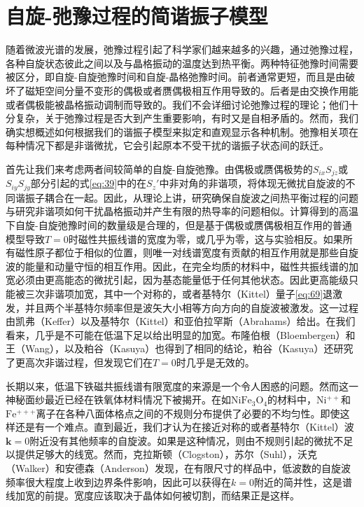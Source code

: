 \documentclass{article}
\begin{document}

\section{自旋-弛豫过程的简谐振子模型} \label{sec:10}

随着微波光谱的发展，弛豫过程引起了科学家们越来越多的兴趣，通过弛豫过程，各种自旋状态彼此之间以及与晶格振动的温度达到热平衡。两种特征弛豫时间需要被区分，即自旋-自旋弛豫时间和自旋-晶格弛豫时间。前者通常更短，而且是由破坏了磁矩空间分量不变形的偶极或者赝偶极相互作用导致的。后者是由交换作用能或者偶极能被晶格振动调制而导致的。我们不会详细讨论弛豫过程的理论；他们十分复杂，关于弛豫过程是否大到产生重要影响，有时又是自相矛盾的。然而，我们确实想概述如何根据我们的谐振子模型来拟定和直观显示各种机制。弛豫相关项在每种情况下都是非谐微扰，它会引起原本不受干扰的谐振子状态间的跃迁。

首先让我们来考虑两者间较简单的自旋-自旋弛豫。由偶极或赝偶极势的$S_{ix}S_{jz}$或$S_{iy}S_{jy}$部分引起的式\eqref{eq:39}中的在$S_z'$中非对角的非谐项，将体现无微扰自旋波的不同谐振子耦合在一起。因此，从理论上讲，研究确保自旋波之间热平衡过程的问题与研究非谐项如何干扰晶格振动并产生有限的热导率的问题相似。计算得到的高温下自旋-自旋弛豫时间的数量级是合理的，但是基于偶极或赝偶极相互作用的普通模型导致$T=0$时磁性共振线谱的宽度为零，或几乎为零，这与实验相反。如果所有磁性原子都位于相似的位置，则唯一对线谱宽度有贡献的相互作用就是那些自旋波的能量和动量守恒的相互作用。因此，在完全均质的材料中，磁性共振线谱的加宽必须由更高能态的微扰引起，因为基态能量低于任何其他状态。因此更高能级只能被三次非谐项加宽，其中一个对称的，或者基特尔（Kittel）量子\eqref{eq:69}退激发，并且两个半基特尔频率但是波矢大小相等方向方向的自旋波被激发。这一过程由凯弗（Keffer）以及基特尔（Kittel）和亚伯拉罕斯（Abrahams）给出。在我们看来，几乎是不可能在低温下足以给出明显的加宽。布隆伯根（Bloembergen）和王（Wang），以及粕谷（Kasuya）也得到了相同的结论，粕谷（Kasuya）还研究了更高次非谐过程，但发现它们在$T=0$时几乎是无效的。

长期以来，低温下铁磁共振线谱有限宽度的来源是一个令人困惑的问题。然而这一神秘面纱最近已经在铁氧体材料情况下被揭开。在如$\mathrm{NiFe_3O_4}$的材料中，$\mathrm{Ni^{\mathit{++}}}$和$\mathrm{Fe^{\mathit{+++}}}$离子在各种八面体格点之间的不规则分布提供了必要的不均匀性。即使这样还是有一个难点。直到最近，我们才认为在接近对称的或者基特尔（Kittel）波$\mathbf{k}=0$附近没有其他频率的自旋波。如果是这种情况，则由不规则引起的微扰不足以提供足够大的线宽。然而，克拉斯顿（Clogston），苏尔（Suhl），沃克（Walker）和安德森（Anderson）发现，在有限尺寸的样品中，低波数的自旋波频率很大程度上收到边界条件影响，因此可以获得在$k=0$附近的简并性，这是谱线加宽的前提。宽度应该取决于晶体如何被切割，而结果正是这样。
\end{document}
